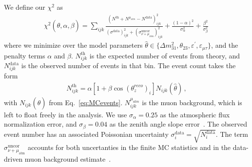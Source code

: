 \documentclass{article}
\newcommand{\zreco}{\ensuremath{\cos{(\theta_z^{reco})}}}
\newcommand{\emt}{\ensuremath{\varepsilon_{\mu\tau}}}
\newcommand{\ep}{\ensuremath{\varepsilon^\prime}}
\begin{document}
We define our $\chi^2$ as
\begin{align} \label{eq:chisq}
    \chi^{2}(\hat{\theta},\alpha,\beta)=\sum_{ijk} \frac{\left(N^\text{th}+N^{\mu_{atm}}-N^\text{data}\right)_{ijk}^{2}}
    {\left(\sigma^\text{data}\right)_{ijk}^{2}+\left(\sigma_{\nu + \mu_\text{atm}}^\text{uncor}\right)_{ijk}^{2}}+ 
    \frac{(1-\alpha)^2}{\sigma_\alpha^2} + \frac{\beta^2}{\sigma_\beta^2}\,
\end{align}
where we minimize over the model parameters $\hat{\theta} \in \{\Delta m_{31}^2, \theta_{23}, \ep, \emt\}$, and the penalty terms $\alpha$ and $\beta$.
$N_{ijk}^\text{th}$ is the expected number of events from theory, and $N_{ijk}^\text{data}$ is the observed number of events in that bin. 
The event count takes the form
\begin{align}
    N^\text{th}_{ijk} = \alpha\left[1+\beta \zreco_i \right] N_{ijk}(\hat{\theta})\,,
\end{align}
with $N_{ijk}(\hat{\theta})$ from Eq.~\ref{eq:MCevents}. $N_{ijk}^{\mu_{atm}}$ is the muon background, which is left to float freely in the analysis.
We use $\sigma_\alpha = 0.25$ as the atmospheric flux normalization error, and $\sigma_\beta = 0.04$ as the zenith angle slope error~\cite{hondapaper}. 
The observed event number has an associated Poissonian uncertainty $\sigma_{i}^\text{data} = \sqrt{N_{i}^\text{data}}$. 
The term $\sigma_{\nu + \mu_\text{atm}}^\text{uncor}$ accounts for both uncertanties in the finite MC statistics and in the data-driven 
muon background estimate~\cite{DC2019data}.



\end{document}
